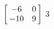 {$\left[\hskip -3pt \begin{array}{cc} -6&0\\  -10&9\end {array} \hskip -3pt
 \right] $} 
{$3$}



  

